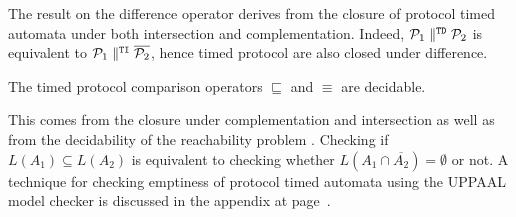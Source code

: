 The result on the difference operator derives from the closure of protocol timed automata under both intersection and complementation. Indeed, $\mathcal{P}_1 \parallel^{\mathtt{TD}} \mathcal{P}_2$ is equivalent to $\mathcal{P}_1 \parallel^{\mathtt{TI}} \overline{\mathcal{P}_2}$, hence timed protocol are also closed under difference.

\begin{corollary}
The timed protocol comparison operators $\sqsubseteq$ and $\equiv$ are decidable.
\end{corollary}

This comes from the closure under complementation and intersection as well as from the decidability of the reachability problem \cite{RADLD94}. Checking if $L(A_1) \subseteq L(A_2)$ is equivalent to checking whether $L(A_1 \cap \overline{A_2}) = \emptyset$ or not. A technique for checking emptiness of protocol timed automata using the UPPAAL model checker is discussed in the appendix at page~\pageref{chap:uppaal-pta}.

